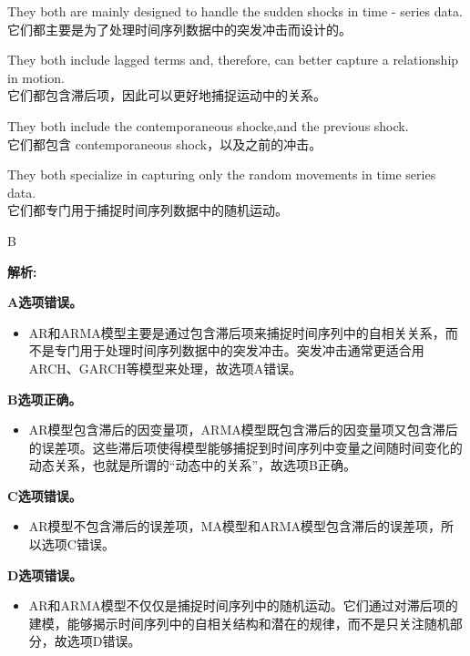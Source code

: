 \documentclass{article}
\newenvironment{explanation}
{\textbf{解析:}\par}
{\par}
\begin{document}
    \begin{choices}
        \item They both are mainly designed to handle the sudden shocks in time - series data.\\
        它们都主要是为了处理时间序列数据中的突发冲击而设计的。
        \item They both include lagged terms and, therefore, can better capture a relationship in motion.\\
        它们都包含滞后项，因此可以更好地捕捉运动中的关系。
        \item They both include the contemporaneous shocke,and the previous shock.\\
        它们都包含 contemporaneous shock，以及之前的冲击。
        \item They both specialize in capturing only the random movements in time series data.\\
        它们都专门用于捕捉时间序列数据中的随机运动。
    \end{choices}
    
    \begin{correctanswer}
        B
    \end{correctanswer}
    
    \begin{explanation}
    \textbf{A选项错误。}
    \begin{itemize}
        \item AR和ARMA模型主要是通过包含滞后项来捕捉时间序列中的自相关关系，而不是专门用于处理时间序列数据中的突发冲击。突发冲击通常更适合用ARCH、GARCH等模型来处理，故选项A错误。
    \end{itemize}
    \textbf{B选项正确。}
    \begin{itemize}
        \item AR模型包含滞后的因变量项，ARMA模型既包含滞后的因变量项又包含滞后的误差项。这些滞后项使得模型能够捕捉到时间序列中变量之间随时间变化的动态关系，也就是所谓的“动态中的关系”，故选项B正确。
    \end{itemize}
    \textbf{C选项错误。}
    \begin{itemize}
        \item AR模型不包含滞后的误差项，MA模型和ARMA模型包含滞后的误差项，所以选项C错误。
    \end{itemize}
    \textbf{D选项错误。}
    \begin{itemize}
        \item AR和ARMA模型不仅仅是捕捉时间序列中的随机运动。它们通过对滞后项的建模，能够揭示时间序列中的自相关结构和潜在的规律，而不是只关注随机部分，故选项D错误。
    \end{itemize}
    \end{explanation}
    
\end{document}
